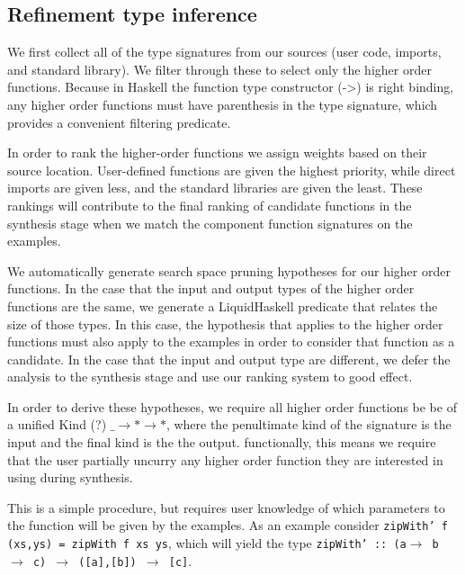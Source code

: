 \subsection{Refinement type inference}

We first collect all of the type signatures from our sources (user code, imports, and standard library). We filter through these to select only the higher order functions. Because in Haskell the function type constructor (->) is right binding, any higher order functions must have parenthesis in the type signature, which provides a convenient filtering predicate.

In order to rank the higher-order functions we assign weights based on their source location. User-defined functions are given the highest priority, while direct imports are given less, and the standard libraries are given the least. These rankings will contribute to the final ranking of candidate functions in the synthesis stage when we match the component function signatures on the examples.


We automatically generate search space pruning hypotheses for our higher order functions.
In the case that the input and output types of the higher order functions are the same, we generate a LiquidHaskell predicate that relates the size of those types.
In this case, the hypothesis that applies to the higher order functions must also apply to the examples in order to consider that function as a candidate.
In the case that the input and output type are different, we defer the analysis to the synthesis stage and use our ranking system to good effect.

In order to derive these hypotheses, we require all higher order functions be be of a unified Kind (?) \texttt{$\_ \to * \to *$}, where the penultimate kind of the signature is the input and the final kind is the the output. functionally, this means we require that the user partially uncurry any higher order function they are interested in using during synthesis.

This is a simple procedure, but requires user knowledge of which parameters to the function will be given by the examples. 
As an example consider \texttt{zipWith' f (xs,ys) = zipWith f xs ys}, which will yield the type \texttt{zipWith' :: (a$\to$ b $\to$ c) $\to$ ([a],[b]) $\to$ [c]}. 


